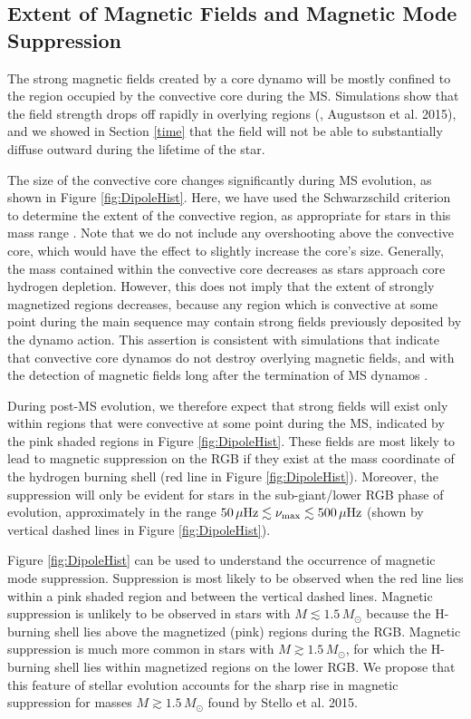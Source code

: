 \subsection{Extent of Magnetic Fields and Magnetic Mode Suppression}
\label{rgb}

The strong magnetic fields created by a core dynamo will be mostly confined to the region occupied by the convective core during the MS. Simulations show that the field strength drops off rapidly in overlying regions (\citealt{Featherstone_2009}, Augustson et al. 2015), and we showed in Section \ref{time} that the field will not be able to substantially diffuse outward during the lifetime of the star. 

The size of the convective core changes significantly during MS evolution, as shown in Figure \ref{fig:DipoleHist}. Here, we have used the Schwarzschild criterion to determine the extent of the convective region, as appropriate for stars in this mass range \citep{Moore_2015}. Note that we do not include any  overshooting above the convective core, which would have the effect to slightly increase the core's size. Generally, the mass contained within the convective core decreases as stars approach core hydrogen depletion. However, this does not imply that the extent of strongly magnetized regions decreases, because any region which is convective at some point during the main sequence may contain strong fields previously deposited by the dynamo action. This assertion is consistent with simulations \citep{Featherstone_2009} that indicate that convective core dynamos do not destroy overlying magnetic fields, and with the detection of magnetic fields long after the termination of MS dynamos \citep{Stello_2016}.

During post-MS evolution, we therefore expect that strong fields will exist only within regions that were convective at some point during the MS, indicated by the pink shaded regions in Figure \ref{fig:DipoleHist}. These fields are most likely to lead to magnetic suppression on the RGB if they exist at the mass coordinate of the hydrogen burning shell (red line in Figure \ref{fig:DipoleHist}). Moreover, the suppression will only be evident for stars in the sub-giant/lower RGB phase of evolution, approximately in the range $50 \, \mu {\rm Hz} \lesssim \nu_{\rm max} \lesssim 500 \, \mu {\rm Hz}$ (shown by vertical dashed lines in Figure \ref{fig:DipoleHist}).

Figure \ref{fig:DipoleHist} can  be used to understand the occurrence of magnetic mode suppression. Suppression is most likely to be observed when the red line lies within a pink shaded region and between the vertical dashed lines. Magnetic suppression is unlikely to be observed in stars with $M \lesssim 1.5 \, M_\odot$ because the H-burning shell lies above the magnetized (pink) regions during the RGB. Magnetic suppression is much more common in stars with $M \gtrsim 1.5 \, M_\odot$, for which the H-burning shell lies within magnetized regions on the lower RGB. We propose that this feature of stellar evolution accounts for the sharp rise in magnetic suppression for masses $M \gtrsim 1.5 \, M_\odot$ found by Stello et al. 2015.

    
    
  
  